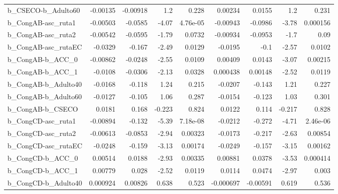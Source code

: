 \begin{tabular}{lrrrrrrrr}
b\_CSECO-b\_Adulto60         &    -0.00135 &     -0.00918 &       1.2 &    0.228 &    0.00234 &      0.0155 &          1.2 &         0.231 \\
b\_CongAB-asc\_ruta1         &    -0.00503 &      -0.0585 &     -4.07 & 4.76e-05 &   -0.00943 &     -0.0986 &        -3.78 &      0.000156 \\
b\_CongAB-asc\_ruta2         &    -0.00542 &      -0.0595 &     -1.79 &   0.0732 &   -0.00934 &     -0.0953 &         -1.7 &          0.09 \\
b\_CongAB-asc\_rutaEC        &     -0.0329 &       -0.167 &     -2.49 &   0.0129 &    -0.0195 &        -0.1 &        -2.57 &        0.0102 \\
b\_CongAB-b\_ACC\_0           &    -0.00862 &      -0.0248 &     -2.55 &   0.0109 &    0.00409 &      0.0143 &        -3.07 &       0.00215 \\
b\_CongAB-b\_ACC\_1           &     -0.0108 &      -0.0306 &     -2.13 &   0.0328 &   0.000438 &     0.00148 &        -2.52 &        0.0119 \\
b\_CongAB-b\_Adulto40        &     -0.0168 &       -0.118 &      1.24 &    0.215 &    -0.0207 &      -0.143 &         1.21 &         0.227 \\
b\_CongAB-b\_Adulto60        &     -0.0127 &       -0.105 &      1.06 &    0.287 &    -0.0154 &      -0.123 &         1.03 &         0.301 \\
b\_CongAB-b\_CSECO           &      0.0181 &        0.168 &    -0.223 &    0.824 &     0.0122 &       0.114 &       -0.217 &         0.828 \\
b\_CongCD-asc\_ruta1         &    -0.00894 &       -0.132 &     -5.39 & 7.18e-08 &    -0.0212 &      -0.272 &        -4.71 &      2.46e-06 \\
b\_CongCD-asc\_ruta2         &    -0.00613 &      -0.0853 &     -2.94 &  0.00323 &    -0.0173 &      -0.217 &        -2.63 &       0.00854 \\
b\_CongCD-asc\_rutaEC        &     -0.0248 &       -0.159 &     -3.13 &  0.00174 &    -0.0249 &      -0.157 &        -3.15 &       0.00162 \\
b\_CongCD-b\_ACC\_0           &     0.00514 &       0.0188 &     -2.93 &  0.00335 &    0.00881 &      0.0378 &        -3.53 &      0.000414 \\
b\_CongCD-b\_ACC\_1           &     0.00779 &        0.028 &     -2.52 &   0.0119 &     0.0114 &      0.0474 &        -2.97 &         0.003 \\
b\_CongCD-b\_Adulto40        &    0.000924 &      0.00826 &     0.638 &    0.523 &  -0.000697 &    -0.00591 &        0.619 &         0.536 \\

\end{tabular}
